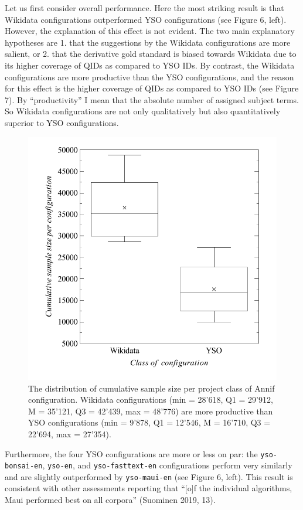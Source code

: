 Let us first consider overall performance. Here the most striking result
is that Wikidata configurations outperformed YSO configurations (see
Figure 6, left). However, the explanation of this effect is not evident.
The two main explanatory hypotheses are 1. that the suggestions by the
Wikidata configurations are more salient, or 2. that the derivative gold
standard is biased towards Wikidata due to its higher coverage of QIDs
as compared to YSO IDs. By contrast, the Wikidata configurations are
more productive than the YSO configurations, and the reason for this
effect is the higher coverage of QIDs as compared to YSO IDs (see Figure
7). By ``productivity'' I mean that the absolute number of assigned
subject terms. So Wikidata configurations are not only qualitatively but
also quantitatively superior to YSO configurations.

\begin{figure}
\centering
\includegraphics{images/metrics_all_productivity.pdf}
\caption{The distribution of cumulative sample size per project class of
Annif configuration. Wikidata configurations (min = 28'618, Q1 = 29'912,
M = 35'121, Q3 = 42'439, max = 48'776) are more productive than YSO
configurations (min = 9'878, Q1 = 12'546, M = 16'710, Q3 = 22'694, max =
27'354).}
\end{figure}

Furthermore, the four YSO configurations are more or less on par: the
\texttt{yso-bonsai-en}, \texttt{yso-en}, and \texttt{yso-fasttext-en}
configurations perform very similarly and are slightly outperformed by
\texttt{yso-maui-en} (see Figure 6, left). This result is consistent
with other assessments reporting that ``{[}o{]}f the individual
algorithms, Maui performed best on all corpora'' (Suominen 2019, 13).

